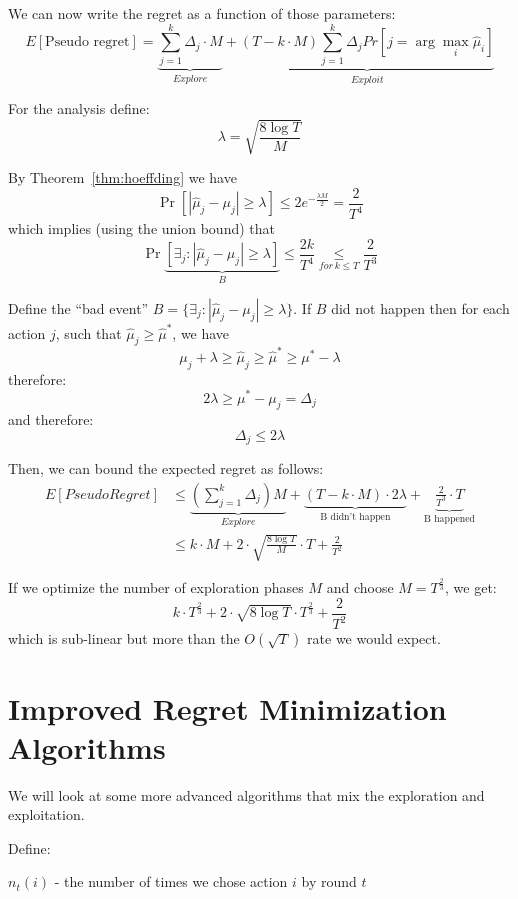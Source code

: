 We can now write the regret as a function of those parameters:
\[
E\left[\text{Pseudo regret}\right]=\underbrace{{\displaystyle
\sum_{j=1}^{k}\Delta_{j}\cdot
M}}_{Explore}+\underbrace{\left(T-k\cdot M\right){\displaystyle
\sum_{j=1}^{k}\Delta_{j}Pr\left[j=\arg\max_{i}\hat{\mu}_{i}\right]}}_{Exploit}
\]

For the analysis define:
\[
\lambda=\sqrt{\frac{8\log T}{M}}
\]

By Theorem~\ref{thm:hoeffding} we have
\[
\Pr\left[\left|\hat{\mu}_{j}-\mu_{j}\right|\ge\lambda\right]  \le
2e^{-\frac{\lambda M}{2}}=\frac{2}{T^{4}}
\]
which implies (using the union bound) that
\[
\Pr\underbrace{\left[\exists_{j}:\left|\hat{\mu}_{j}-\mu_{j}\right|\ge\lambda\right]}_{B}
 \le  \frac{2k}{T^{4}}\underset{for\,k\leq T}{\leq}\frac{2}{T^{3}}
\]

Define the ``bad event''
$B=\{\exists_{j}:\left|\hat{\mu}_{j}-\mu_{j}\right|\ge\lambda\}$. If
$B$ did not happen then for each action $j$, such that
$\hat{\mu}_{j}\ge\hat{\mu}^{*}$, we have
\[
\mu_{j}+\lambda\ge\hat{\mu}_{j}\ge\hat{\mu}^{*}\ge\mu^{*}-\lambda
\]
therefore:
\[
2\lambda\ge\mu^{*}-\mu_{j}=\Delta_{j}
\]
and therefore:
\[
\Delta_{j}\le2\lambda
\]

Then, we can bound the expected regret as follows:
\begin{align*}
E[PseudoRegret] & \leq  \underbrace{\left({\displaystyle
\sum_{j=1}^{k}\Delta_{j}}\right)M}_{Explore}+\underbrace{\left(T-k\cdot
M\right)\cdot2\lambda}_{\text{B didn't
happen}}+\underbrace{\frac{2}{T^{3}}\cdot T}_{\text{B happened}}\\
 & \leq  k\cdot M+2\cdot\sqrt{\frac{8\log T}{M}}\cdot T+\frac{2}{T^{2}}
\end{align*}

If we optimize the number of exploration phases $M$ and choose $M=T^{\frac{2}{3}}$,
we get:
\[
k\cdot T^{\frac{2}{3}}+2\cdot\sqrt{8\log T}\cdot
T^{\frac{2}{3}}+\frac{2}{T^{2}}
\]
which is sub-linear but more than the $O(\sqrt{T})$ rate we would
expect.

\section{Improved Regret Minimization Algorithms}

We will look at some more advanced algorithms that mix the
exploration and exploitation.

Define:

$n_{t}(i)$ - the number of times we chose action $i$ by round $t$


